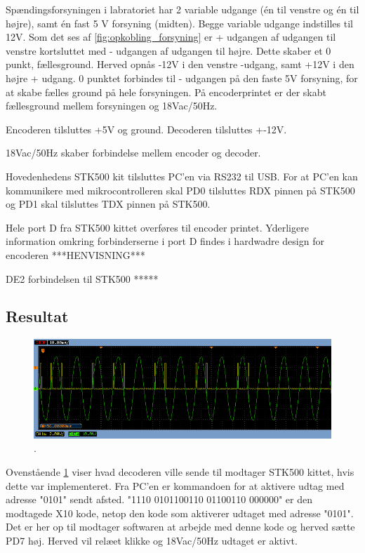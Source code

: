 Spændingsforsyningen i labratoriet har 2 variable udgange (én til venstre og én til højre), samt én fast 5 V forsyning (midten). Begge variable udgange indstilles til 12V. 
Som det ses af \ref{fig:opkobling_forsyning} er + udgangen af udgangen til venstre kortsluttet med - udgangen af udgangen til højre. Dette skaber et 0 punkt, fællesground. Herved opnås -12V i den venstre -udgang, samt +12V i den højre + udgang. 0 punktet forbindes til - udgangen på den faste 5V forsyning, for at skabe fælles ground på hele forsyningen. På encoderprintet er der skabt fællesground mellem forsyningen og 18Vac/50Hz.

Encoderen tilsluttes +5V og ground.
Decoderen tilsluttes +-12V.

18Vac/50Hz skaber forbindelse mellem encoder og decoder.

Hovedenhedens STK500 kit tilsluttes PC'en via RS232 til USB. For at PC'en kan kommunikere med mikrocontrolleren skal PD0 tilsluttes RDX pinnen på STK500 og PD1 skal tilsluttes TDX pinnen på STK500. 

Hele port D fra STK500 kittet overføres til encoder printet. Yderligere information omkring forbinderserne i port D findes i hardwadre design for encoderen ***HENVISNING***

DE2 forbindelsen til STK500 *****

\subsection{Resultat}


\begin{figure}[htbp]
	\centering
	\includegraphics[width=\textwidth]{billeder/IntTest/Modtager_0101_ON}
	\caption{.}
	\label{fig:Modtager_0101_ON}
\end{figure}

Ovenstående \ref{fig:Modtager_0101_ON} viser hvad decoderen ville sende til modtager STK500 kittet, hvis dette var implementeret. Fra PC'en er kommandoen for at aktivere udtag med adresse "0101" sendt afsted.
"1110 0101100110 01100110 000000" er den modtagede X10 kode, netop den kode som aktiverer udtaget med adresse "0101". Det er her op til modtager softwaren at arbejde med denne kode og herved sætte PD7 høj. Herved vil relæet klikke og 18Vac/50Hz udtaget er aktivt. 







